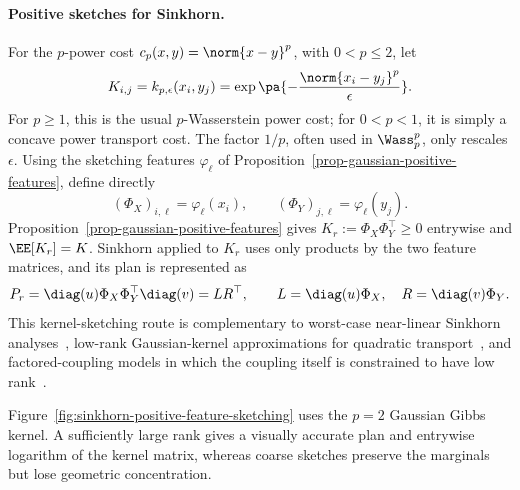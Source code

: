 \paragraph{Positive sketches for Sinkhorn.}
For the \(p\)-power cost \(c_p(x,y)=\norm{x-y}^p\), with \(0<p\leq2\), let
\[
	K_{i,j}=k_{p,\epsilon}(x_i,y_j)
	=\exp\pa{-\frac{\norm{x_i-y_j}^p}{\epsilon}}.
\]
For \(p\geq1\), this is the usual \(p\)-Wasserstein power cost; for \(0<p<1\), it is simply a concave power transport cost. The factor \(1/p\), often used in \(\Wass_p^p\), only rescales \(\epsilon\). Using the sketching features \(\varphi_\ell\) of Proposition~\ref{prop-gaussian-positive-features}, define directly
\[
	(\Phi_X)_{i,\ell}=\varphi_\ell(x_i),
	\qquad
	(\Phi_Y)_{j,\ell}=\varphi_\ell(y_j).
\]
Proposition~\ref{prop-gaussian-positive-features} gives \(K_r:=\Phi_X\Phi_Y^\top\geq0\) entrywise and \(\EE[K_r]=K\). Sinkhorn applied to \(K_r\) uses only products by the two feature matrices, and its plan is represented as
\[
	P_r
	=
	\diag(u)\Phi_X\Phi_Y^\top\diag(v)
	=
	LR^\top,
	\qquad
	L=\diag(u)\Phi_X,
	\quad
	R=\diag(v)\Phi_Y.
\]
This kernel-sketching route is complementary to worst-case near-linear Sinkhorn analyses~\cite{altschuler2017near}, low-rank Gaussian-kernel approximations for quadratic transport~\cite{AltschulerBachRudiWeed2018QuadraticTransport}, and factored-coupling models in which the coupling itself is constrained to have low rank~\cite{scetbon2021lowrank}.

Figure~\ref{fig:sinkhorn-positive-feature-sketching} uses the \(p=2\) Gaussian Gibbs kernel. A sufficiently large rank gives a visually accurate plan and entrywise logarithm of the kernel matrix, whereas coarse sketches preserve the marginals but lose geometric concentration.

